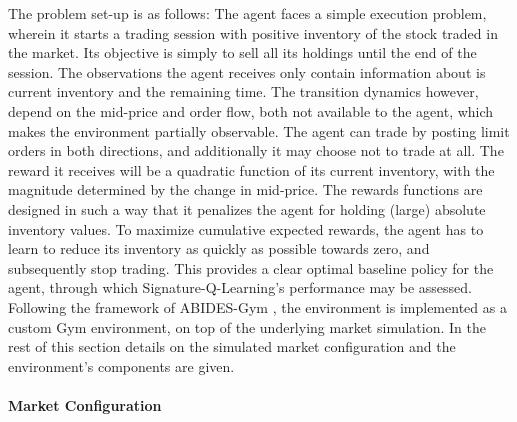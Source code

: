 \documentclass[
    a4paper,
    11pt,
    bibliography=totoc,
    listof=totoc,      
    headinclude=true,
    cleardoublepage=empty,
]{scrbook}
\theoremstyle{plain}
\theoremstyle{definition}
\theoremstyle{remark}
\begin{document}
The problem set-up is as follows: The agent faces a simple execution problem,
wherein it starts a trading session with positive inventory of the stock 
traded in the market. Its objective is simply to sell all its holdings until 
the end of the session. The observations the agent receives only contain information 
about is current inventory and the remaining time. The transition dynamics 
however, depend on the mid-price and order flow, both not available to the 
agent, which makes the environment partially observable. The agent can trade 
by posting limit orders in both directions, and additionally it may choose not 
to trade at all. The reward it receives will be a quadratic function of its 
current inventory, with the magnitude determined by the change in mid-price. 
The rewards functions are designed in such a way that it penalizes
the agent for holding (large) absolute inventory values. To maximize 
cumulative expected rewards, the agent has to learn to reduce its inventory
as quickly as possible towards zero, and subsequently stop trading. This 
provides a clear optimal baseline policy for the agent, through which 
Signature-Q-Learning's performance may be assessed. Following the framework of 
ABIDES-Gym \cite{amrouni2022_aemdesafm}, the environment is implemented as a 
custom Gym environment, on top of the underlying market simulation. In the 
rest of this section details on the simulated market configuration and the 
environment's components are given.

\paragraph{Market Configuration}
\label{chapter:Experiments:section:Execution:sub:Environment:par:MarketConfig}
\end{document}
